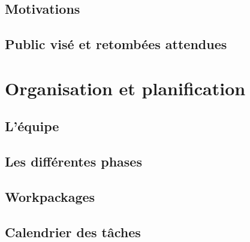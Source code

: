 \documentclass{article}
\begin{document}
\subsection{Motivations}

\subsection{Public visé et retombées attendues}

\section{Organisation et planification}

\subsection{L'équipe}

\subsection{Les différentes phases}

\subsection{Workpackages}

\subsection{Calendrier des tâches}
\end{document}
